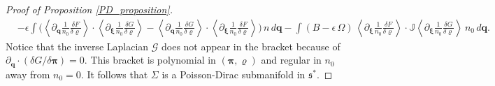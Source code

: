 \documentclass[10pt,a4paper]{amsart}
\begin{document}
\begin{proof}[Proof of Proposition \ref{PD_proposition}]
\begin{align}
&-\epsilon\int \bigg(\left\langle\partial_{\bm{q}}\frac{1}{n_0}\frac{\delta F}{\delta\varrho}\right\rangle\cdot\left\langle\partial_{\bm{\xi}}\frac{1}{n_0}\frac{\delta G}{\delta\varrho}\right\rangle-\left\langle\partial_{\bm{q}}\frac{1}{n_0}\frac{\delta G}{\delta\varrho}\right\rangle\cdot\left\langle\partial_{\bm{\xi}}\frac{1}{n_0}\frac{\delta F}{\delta\varrho}\right\rangle\bigg)\,n\,d\bm{q}-\int (B-\epsilon\,\Omega)\, \left\langle\partial_{\bm{\xi}}\frac{1}{n_0}\frac{\delta F}{\delta\varrho}\right\rangle\cdot \mathbb{J} \left\langle\partial_{\bm{\xi}}\frac{1}{n_0}\frac{\delta G}{\delta\varrho}\right\rangle\,n_0\,d\bm{q}.\label{QNVP_cbracket}
\end{align}
Notice that the inverse Laplacian $\mathcal{G}$ does not appear in the bracket because of $\partial_{\bm{q}}\cdot (\delta G/\delta\bm{\pi}) = 0$. This bracket is polynomial in $(\bm{\pi},\varrho)$ and regular in $n_0$ away from $n_0 = 0$. It follows that $\Sigma$ is a Poisson-Dirac submanifold in $\mathfrak{s}^*$. 

\end{proof}
\end{document}
